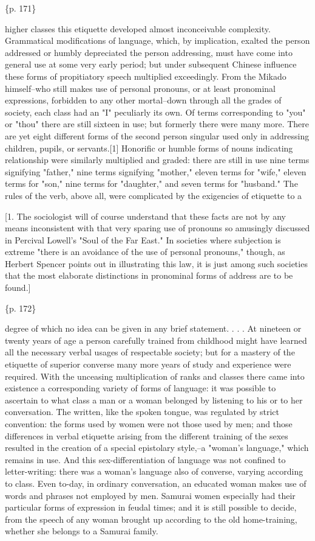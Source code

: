\{p. 171\}

higher classes this etiquette developed almost inconceivable complexity. Grammatical modifications of language, which, by implication, exalted the person addressed or humbly depreciated the person addressing, must have come into general use at some very early period; but under subsequent Chinese influence these forms of propitiatory speech multiplied exceedingly. From the Mikado himself--who still makes use of personal pronouns, or at least pronominal expressions, forbidden to any other mortal--down through all the grades of society, each class had an "I" peculiarly its own. Of terms corresponding to "you" or "thou" there are still sixteen in use; but formerly there were many more. There are yet eight different forms of the second person singular used only in addressing children, pupils, or servants.[1] Honorific or humble forms of nouns indicating relationship were similarly multiplied and graded: there are still in use nine terms signifying "father," nine terms signifying "mother," eleven terms for "wife," eleven terms for "son," nine terms for "daughter," and seven terms for "husband." The rules of the verb, above all, were complicated by the exigencies of etiquette to a

[1. The sociologist will of course understand that these facts are not by any means inconsistent with that very sparing use of pronouns so amusingly discussed in Percival Lowell's "Soul of the Far East." In societies where subjection is extreme "there is an avoidance of the use of personal pronouns," though, as Herbert Spencer points out in illustrating this law, it is just among such societies that the most elaborate distinctions in pronominal forms of address are to be found.]

\{p. 172\}

degree of which no idea can be given in any brief statement. . . . At nineteen or twenty years of age a person carefully trained from childhood might have learned all the necessary verbal usages of respectable society; but for a mastery of the etiquette of superior converse many more years of study and experience were required. With the unceasing multiplication of ranks and classes there came into existence a corresponding variety of forms of language: it was possible to ascertain to what class a man or a woman belonged by listening to his or to her conversation. The written, like the spoken tongue, was regulated by strict convention: the forms used by women were not those used by men; and those differences in verbal etiquette arising from the different training of the sexes resulted in the creation of a special epistolary style,--a "woman's language," which remains in use. And this sex-differentiation of language was not confined to letter-writing: there was a woman's language also of converse, varying according to class. Even to-day, in ordinary conversation, an educated woman makes use of words and phrases not employed by men. Samurai women especially had their particular forms of expression in feudal times; and it is still possible to decide, from the speech of any woman brought up according to the old home-training, whether she belongs to a Samurai family.

